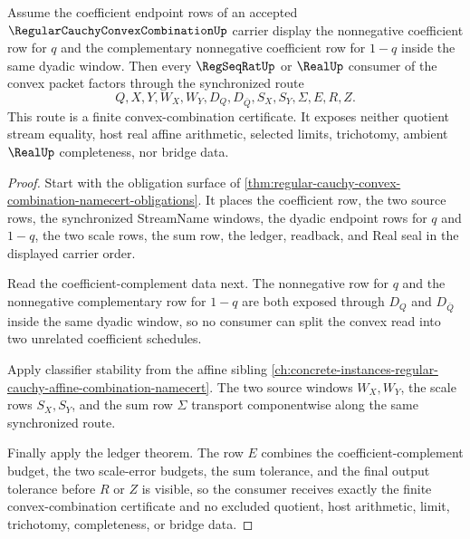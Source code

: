 \begin{theorem}
\label{thm:regular-cauchy-convex-combination-affine-route}
Assume the coefficient endpoint rows of an accepted $\RegularCauchyConvexCombinationUp$ carrier display the nonnegative coefficient row for $q$ and the complementary nonnegative coefficient row for $1-q$ inside the same dyadic window. Then every $\RegSeqRatUp$ or $\RealUp$ consumer of the convex packet factors through the synchronized route
$$
Q,X,Y,W_X,W_Y,D_Q,D_{\bar Q},S_X,S_Y,\Sigma,E,R,Z .
$$
This route is a finite convex-combination certificate. It exposes neither quotient stream equality, host real affine arithmetic, selected limits, trichotomy, ambient $\RealUp$ completeness, nor bridge data.
\end{theorem}
\begin{proof}
Start with the obligation surface of \autoref{thm:regular-cauchy-convex-combination-namecert-obligations}. It places the coefficient row, the two source rows, the synchronized StreamName windows, the dyadic endpoint rows for $q$ and $1-q$, the two scale rows, the sum row, the ledger, readback, and Real seal in the displayed carrier order.

Read the coefficient-complement data next. The nonnegative row for $q$ and the nonnegative complementary row for $1-q$ are both exposed through $D_Q$ and $D_{\bar Q}$ inside the same dyadic window, so no consumer can split the convex read into two unrelated coefficient schedules.

Apply classifier stability from the affine sibling \autoref{ch:concrete-instances-regular-cauchy-affine-combination-namecert}. The two source windows $W_X,W_Y$, the scale rows $S_X,S_Y$, and the sum row $\Sigma$ transport componentwise along the same synchronized route.

Finally apply the ledger theorem. The row $E$ combines the coefficient-complement budget, the two scale-error budgets, the sum tolerance, and the final output tolerance before $R$ or $Z$ is visible, so the consumer receives exactly the finite convex-combination certificate and no excluded quotient, host arithmetic, limit, trichotomy, completeness, or bridge data.
\end{proof}

